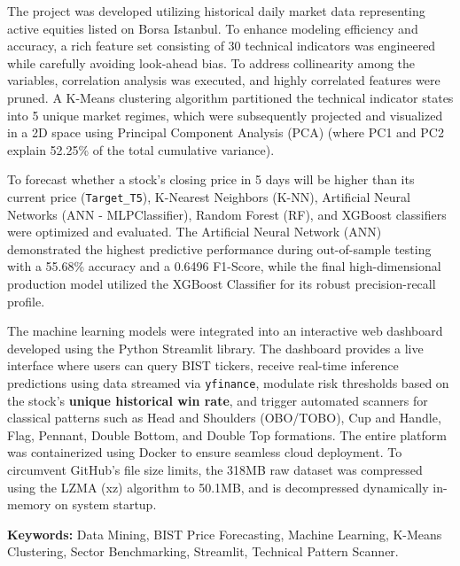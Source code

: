 \documentclass[12pt,a4paper]{report}
\begin{document}
The project was developed utilizing historical daily market data representing active equities listed on Borsa Istanbul. To enhance modeling efficiency and accuracy, a rich feature set consisting of 30 technical indicators was engineered while carefully avoiding look-ahead bias. To address collinearity among the variables, correlation analysis was executed, and highly correlated features were pruned. A K-Means clustering algorithm partitioned the technical indicator states into 5 unique market regimes, which were subsequently projected and visualized in a 2D space using Principal Component Analysis (PCA) (where PC1 and PC2 explain 52.25\% of the total cumulative variance).

To forecast whether a stock's closing price in 5 days will be higher than its current price (\texttt{Target\_T5}), K-Nearest Neighbors (K-NN), Artificial Neural Networks (ANN - MLPClassifier), Random Forest (RF), and XGBoost classifiers were optimized and evaluated. The Artificial Neural Network (ANN) demonstrated the highest predictive performance during out-of-sample testing with a 55.68\% accuracy and a 0.6496 F1-Score, while the final high-dimensional production model utilized the XGBoost Classifier for its robust precision-recall profile.

The machine learning models were integrated into an interactive web dashboard developed using the Python Streamlit library. The dashboard provides a live interface where users can query BIST tickers, receive real-time inference predictions using data streamed via \texttt{yfinance}, modulate risk thresholds based on the stock's \textbf{unique historical win rate}, and trigger automated scanners for classical patterns such as Head and Shoulders (OBO/TOBO), Cup and Handle, Flag, Pennant, Double Bottom, and Double Top formations. The entire platform was containerized using Docker to ensure seamless cloud deployment. To circumvent GitHub's file size limits, the 318MB raw dataset was compressed using the LZMA (xz) algorithm to 50.1MB, and is decompressed dynamically in-memory on system startup.

\vspace*{1cm}
\noindent \textbf{Keywords:} Data Mining, BIST Price Forecasting, Machine Learning, K-Means Clustering, Sector Benchmarking, Streamlit, Technical Pattern Scanner.

\newpage

\tableofcontents

\newpage
{}
\end{document}
